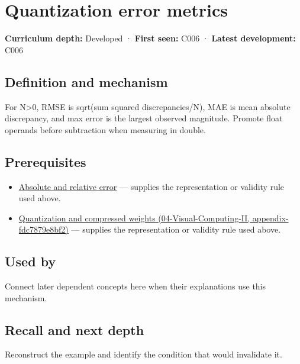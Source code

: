 \hypertarget{appendix-537171d69d27}{}
\section{Quantization error metrics}\label{appendix-537171d69d27-quantization-error-metrics}

\textbf{Curriculum depth:} Developed · \textbf{First seen:} C006 · \textbf{Latest development:} C006

\subsection{Definition and mechanism}\label{appendix-537171d69d27-definition-and-mechanism}

For N\textgreater0, RMSE is sqrt(sum squared discrepancies/N), MAE is mean absolute discrepancy, and max error is the largest observed magnitude. Promote float operands before subtraction when measuring in double.

\subsection{Prerequisites}\label{appendix-537171d69d27-prerequisites}

\begin{itemize}
\tightlist
\item
  \hyperref[appendix-3ae74e89b4e6]{Absolute and relative error} --- supplies the representation or validity rule used above.
\item
  \href{../04-Visual-Computing-II/main.pdf\#nameddest=appendix-fdc7879e8bf2}{Quantization and compressed weights (04-Visual-Computing-II, appendix-fdc7879e8bf2)} --- supplies the representation or validity rule used above.
\end{itemize}

\subsection{Used by}\label{appendix-537171d69d27-used-by}

Connect later dependent concepts here when their explanations use this mechanism.

\subsection{Recall and next depth}\label{appendix-537171d69d27-recall-and-next-depth}

Reconstruct the example and identify the condition that would invalidate it.

